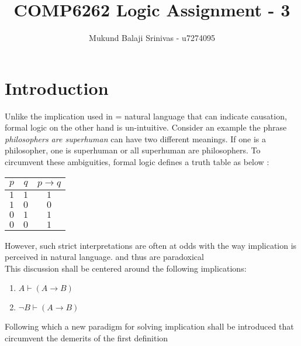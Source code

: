 \documentclass[a4paper]{article}
\title{COMP6262 Logic Assignment - 3}
\author{Mukund Balaji Srinivas - u7274095}
\begin{document}
\maketitle
\section*{Introduction}
Unlike the implication used in = natural language that can indicate causation, formal logic on the other hand is un-intuitive. Consider an example the phrase \textit{philosophers are superhuman } can have two different meanings. If one is a philosopher, one is superhuman or all superhuman are philosophers. \linebreak  
To circumvent these ambiguities, formal logic defines a truth table as below : 
\begin{center}
\begin{tabular}{|c|c|c|}
	$p$ & $q$ & $p \rightarrow q$ \\
	\midrule
	$1$ & $1$ & $1$ \\
	$1$ & $0$ & $0$ \\
	$0$ & $1$ & $1$ \\
	$0$ & $0$ & $1$ \\	
\end{tabular}
\end{center}
However, such strict interpretations are often at odds with the way implication is perceived in natural language. and thus are paradoxical\\
This discussion shall be centered around the following implications:
\begin{enumerate}
	\item{$A \vdash (A \rightarrow B)$}
	\item{$\lnot B \vdash (A \rightarrow B)$}	
\end{enumerate}
Following which a new paradigm for solving implication shall be introduced that circumvent the demerits of the first definition
\end{document}
